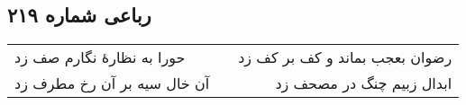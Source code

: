 \begin{center}
\section*{رباعی شماره ۲۱۹}
\label{sec:sh219}
\begin{longtable}{l p{0.5cm} r}
حورا به نظارهٔ نگارم صف زد
&&
رضوان بعجب بماند و کف بر کف زد
\\
آن خال سیه بر آن رخ مطرف زد
&&
ابدال زبیم چنگ در مصحف زد
\\
\end{longtable}
\end{center}
